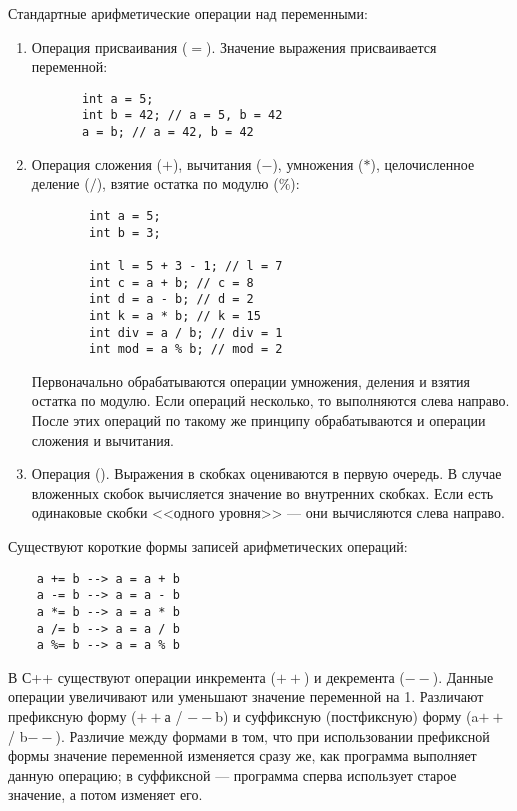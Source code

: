 Стандартные арифметические операции над переменными:
\begin{enumerate}
    \item Операция присваивания ($=$). Значение выражения присваивается переменной:
    \lstset{style=CPlusPlus}
    \begin{lstlisting}
       int a = 5;
       int b = 42; // a = 5, b = 42
       a = b; // a = 42, b = 42
    \end{lstlisting}
    \item Операция сложения ($+$), вычитания ($-$), умножения ($*$), целочисленное деление ($/$), взятие остатка по модулю ($\%$):
    \lstset{style=CPlusPlus}
    \begin{lstlisting}
        int a = 5;
        int b = 3;
        
        int l = 5 + 3 - 1; // l = 7
        int c = a + b; // c = 8
        int d = a - b; // d = 2
        int k = a * b; // k = 15
        int div = a / b; // div = 1
        int mod = a % b; // mod = 2
    \end{lstlisting}
    
    Первоначально обрабатываются операции умножения, деления и взятия остатка по модулю. Если операций несколько, то выполняются слева направо. После этих операций по такому же принципу обрабатываются и операции сложения и вычитания.
    
    \item Операция (). Выражения в скобках оцениваются в первую очередь. В случае вложенных скобок вычисляется значение во внутренних скобках. Если есть одинаковые скобки <<одного уровня>> --- они вычисляются слева направо. 
\end{enumerate} 

Существуют короткие формы записей арифметических операций:
\lstset{style=CPlusPlus}
\begin{lstlisting}
    a += b --> a = a + b
    a -= b --> a = a - b
    a *= b --> a = a * b
    a /= b --> a = a / b
    a %= b --> a = a % b
\end{lstlisting}

В С++ существуют операции инкремента ($++$) и декремента ($--$). Данные операции увеличивают или уменьшают значение переменной на 1. Различают префиксную форму ($++$а / $--$b) и суффиксную (постфиксную) форму (a$++$ / b$--$). Различие между формами в том, что при использовании префиксной формы значение переменной изменяется сразу же, как программа выполняет данную операцию; в суффиксной --- программа сперва использует старое значение, а потом изменяет его.

